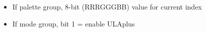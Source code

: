 \begin{itemize}
\item[] If palette group, 8-bit (RRRGGGBB) value for current index
\item[] If mode group, bit 1 = enable ULAplus
\end{itemize}

